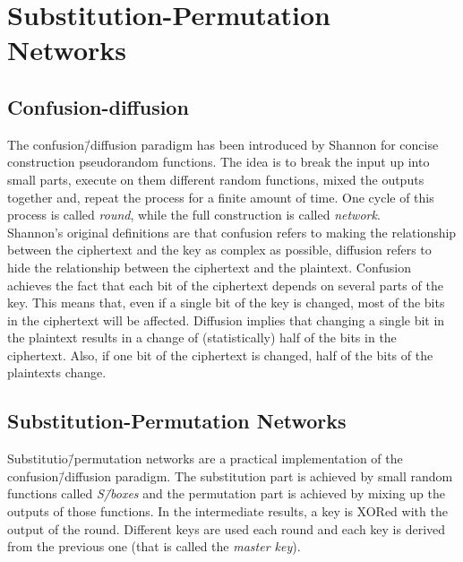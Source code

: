 \section{Substitution-Permutation Networks}
\subsection{Confusion-diffusion}
The confusion\=/diffusion paradigm has been introduced by Shannon for concise construction  pseudorandom functions. The idea is to break the input up into small parts, execute on them different random functions, mixed the outputs together and, repeat the process for a finite amount of time. One cycle of this process is called \emph{round}, while the full construction is called \emph{network}.\\
Shannon's original definitions are that confusion refers to making the relationship between the ciphertext and the key as complex as possible, diffusion refers to hide the relationship between the ciphertext and the plaintext.
Confusion achieves the fact that each bit of the ciphertext depends on several parts of the key. This means that, even if a single bit of the key is changed, most of the bits in the ciphertext will be affected.
Diffusion implies that changing a single bit in the plaintext results in a change of (statistically) half of the bits in the ciphertext. Also, if one bit of the ciphertext is changed, half of the bits of the plaintexts change.

\subsection{Substitution-Permutation Networks}
Substitutio\=/permutation networks are a practical implementation of the confusion\=/diffusion paradigm. The substitution part is achieved by small random functions called \emph{S\=/boxes} and the permutation part is achieved by mixing up the outputs of those functions. In the intermediate results, a key is XORed with the output of the round. Different keys are used each round and each key is derived from the previous one (that is called the \emph{master key}).
